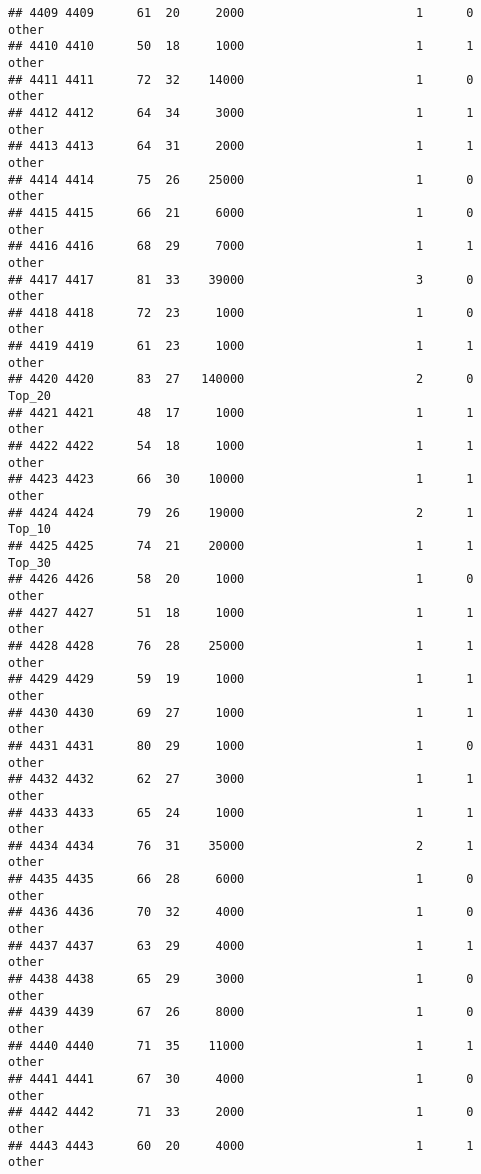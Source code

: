 \documentclass[
]{article}
\begin{document}
\begin{verbatim}
## 4409 4409      61  20     2000                        1      0    other
## 4410 4410      50  18     1000                        1      1    other
## 4411 4411      72  32    14000                        1      0    other
## 4412 4412      64  34     3000                        1      1    other
## 4413 4413      64  31     2000                        1      1    other
## 4414 4414      75  26    25000                        1      0    other
## 4415 4415      66  21     6000                        1      0    other
## 4416 4416      68  29     7000                        1      1    other
## 4417 4417      81  33    39000                        3      0    other
## 4418 4418      72  23     1000                        1      0    other
## 4419 4419      61  23     1000                        1      1    other
## 4420 4420      83  27   140000                        2      0   Top_20
## 4421 4421      48  17     1000                        1      1    other
## 4422 4422      54  18     1000                        1      1    other
## 4423 4423      66  30    10000                        1      1    other
## 4424 4424      79  26    19000                        2      1   Top_10
## 4425 4425      74  21    20000                        1      1   Top_30
## 4426 4426      58  20     1000                        1      0    other
## 4427 4427      51  18     1000                        1      1    other
## 4428 4428      76  28    25000                        1      1    other
## 4429 4429      59  19     1000                        1      1    other
## 4430 4430      69  27     1000                        1      1    other
## 4431 4431      80  29     1000                        1      0    other
## 4432 4432      62  27     3000                        1      1    other
## 4433 4433      65  24     1000                        1      1    other
## 4434 4434      76  31    35000                        2      1    other
## 4435 4435      66  28     6000                        1      0    other
## 4436 4436      70  32     4000                        1      0    other
## 4437 4437      63  29     4000                        1      1    other
## 4438 4438      65  29     3000                        1      0    other
## 4439 4439      67  26     8000                        1      0    other
## 4440 4440      71  35    11000                        1      1    other
## 4441 4441      67  30     4000                        1      0    other
## 4442 4442      71  33     2000                        1      0    other
## 4443 4443      60  20     4000                        1      1    other

\end{verbatim}
\end{document}
